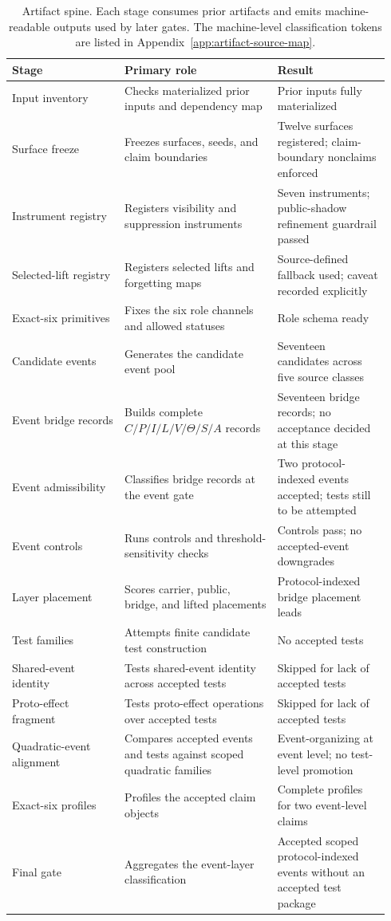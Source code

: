 \documentclass[11pt]{article}
\theoremstyle{definition}
\begin{document}
\begin{table}[t]
\centering
\small
\setlength{\tabcolsep}{4pt}
\begin{tabular}{p{0.28\linewidth}p{0.38\linewidth}p{0.28\linewidth}}
\hline
\textbf{Stage} & \textbf{Primary role} & \textbf{Result} \\
\hline
Input inventory
&
Checks materialized prior inputs and dependency map
&
Prior inputs fully materialized
\\
Surface freeze
&
Freezes surfaces, seeds, and claim boundaries
&
Twelve surfaces registered; claim-boundary nonclaims enforced
\\
Instrument registry
&
Registers visibility and suppression instruments
&
Seven instruments; public-shadow refinement guardrail passed
\\
Selected-lift registry
&
Registers selected lifts and forgetting maps
&
Source-defined fallback used; caveat recorded explicitly
\\
Exact-six primitives
&
Fixes the six role channels and allowed statuses
&
Role schema ready
\\
Candidate events
&
Generates the candidate event pool
&
Seventeen candidates across five source classes
\\
Event bridge records
&
Builds complete \(C/P/I/L/V/\Theta/S/A\) records
&
Seventeen bridge records; no acceptance decided at this stage
\\
Event admissibility
&
Classifies bridge records at the event gate
&
Two protocol-indexed events accepted; tests still to be attempted
\\
Event controls
&
Runs controls and threshold-sensitivity checks
&
Controls pass; no accepted-event downgrades
\\
Layer placement
&
Scores carrier, public, bridge, and lifted placements
&
Protocol-indexed bridge placement leads
\\
Test families
&
Attempts finite candidate test construction
&
No accepted tests
\\
Shared-event identity
&
Tests shared-event identity across accepted tests
&
Skipped for lack of accepted tests
\\
Proto-effect fragment
&
Tests proto-effect operations over accepted tests
&
Skipped for lack of accepted tests
\\
Quadratic-event alignment
&
Compares accepted events and tests against scoped quadratic families
&
Event-organizing at event level; no test-level promotion
\\
Exact-six profiles
&
Profiles the accepted claim objects
&
Complete profiles for two event-level claims
\\
Final gate
&
Aggregates the event-layer classification
&
Accepted scoped protocol-indexed events without an accepted test package
\\
\hline
\end{tabular}
\caption{Artifact spine. Each stage consumes prior artifacts and emits machine-readable outputs used by later gates. The machine-level classification tokens are listed in Appendix~\ref{app:artifact-source-map}.}
\label{tab:ticket32-artifact-spine}
\end{table}
\end{document}
